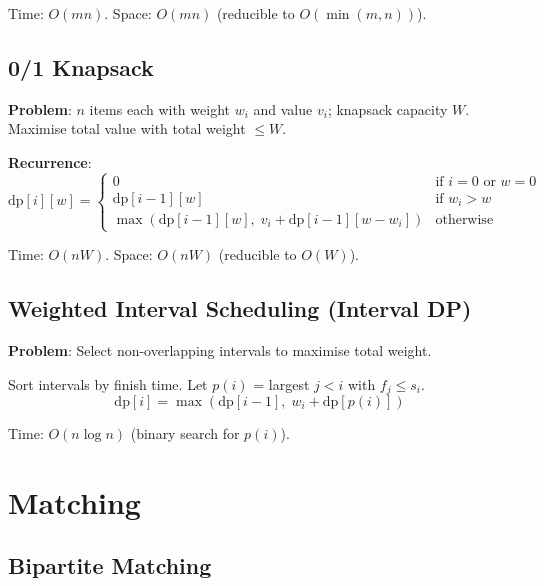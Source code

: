 \documentclass[oneside]{book}
\begin{document}
Time: $O(mn)$. Space: $O(mn)$ (reducible to $O(\min(m,n))$).

\subsection*{0/1 Knapsack}

\textbf{Problem}: $n$ items each with weight $w_i$ and value $v_i$; knapsack capacity $W$.
Maximise total value with total weight $\leq W$.

\textbf{Recurrence}:
\[
    \text{dp}[i][w] =
    \begin{cases}
        0 & \text{if } i = 0 \text{ or } w = 0 \\
        \text{dp}[i-1][w] & \text{if } w_i > w \\
        \max\!\left(\text{dp}[i-1][w],\; v_i + \text{dp}[i-1][w-w_i]\right) & \text{otherwise}
    \end{cases}
\]

Time: $O(nW)$. Space: $O(nW)$ (reducible to $O(W)$).


\subsection*{Weighted Interval Scheduling (Interval DP)}

\textbf{Problem}: Select non-overlapping intervals to maximise total weight.

Sort intervals by finish time. Let $p(i)$ = largest $j < i$ with $f_j \leq s_i$.
\[
    \text{dp}[i] = \max\!\left(\text{dp}[i-1],\; w_i + \text{dp}[p(i)]\right)
\]

Time: $O(n \log n)$ (binary search for $p(i)$).

\section{Matching}

\subsection*{Bipartite Matching}

\end{document}
